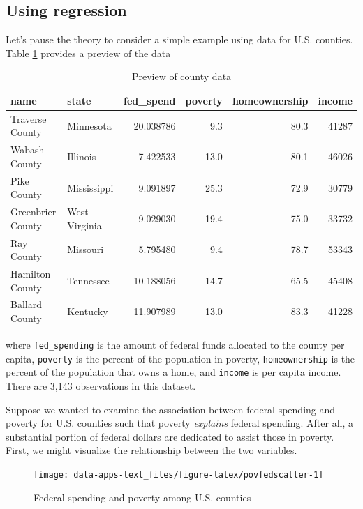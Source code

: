 \documentclass[
]{book}
\begin{document}
\hypertarget{using-regression}{%
\subsection{Using regression}\label{using-regression}}

Let's pause the theory to consider a simple example using data for U.S. counties. Table \ref{tab:countydata} provides a preview of the data

\begin{table}

\caption{\label{tab:countydata}Preview of county data}
\centering
\begin{tabular}[t]{l|l|r|r|r|r}
\hline
name & state & fed\_spend & poverty & homeownership & income\\
\hline
Traverse County & Minnesota & 20.038786 & 9.3 & 80.3 & 41287\\
\hline
Wabash County & Illinois & 7.422533 & 13.0 & 80.1 & 46026\\
\hline
Pike County & Mississippi & 9.091897 & 25.3 & 72.9 & 30779\\
\hline
Greenbrier County & West Virginia & 9.029030 & 19.4 & 75.0 & 33732\\
\hline
Ray County & Missouri & 5.795480 & 9.4 & 78.7 & 53343\\
\hline
Hamilton County & Tennessee & 10.188056 & 14.7 & 65.5 & 45408\\
\hline
Ballard County & Kentucky & 11.907989 & 13.0 & 83.3 & 41228\\
\hline
\end{tabular}
\end{table}

where \texttt{fed\_spending} is the amount of federal funds allocated to the county per capita, \texttt{poverty} is the percent of the population in poverty, \texttt{homeownership} is the percent of the population that owns a home, and \texttt{income} is per capita income. There are 3,143 observations in this dataset.

Suppose we wanted to examine the association between federal spending and poverty for U.S. counties such that poverty \emph{explains} federal spending. After all, a substantial portion of federal dollars are dedicated to assist those in poverty. First, we might visualize the relationship between the two variables.

\begin{figure}

{\centering \texttt{[image: data-apps-text\_files/figure-latex/povfedscatter-1]} 

}

\caption{Federal spending and poverty among U.S. counties}\label{fig:povfedscatter}
\end{figure}
\end{document}
